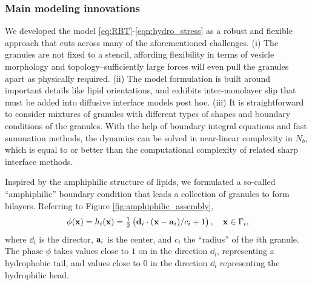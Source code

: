 \subsubsection{Main modeling innovations}
We developed the model \eqref{eq:RBT}-\eqref{eqn:hydro_stress} 
as a robust and flexible approach
that cuts across many of the aforementioned challenges.
(i) The granules are not fixed to a stencil, 
affording flexibility in terms of vesicle morphology and topology--sufficiently
large forces will even pull the granules apart as physically required.
(ii) The model formulation is built around important details like lipid orientations,
and exhibits inter-monolayer slip that must be added into diffusive interface models
post hoc. 
(iii) It is straightforward to consider mixtures of granules with different
types of shapes and boundary conditions of the granules.
With the help of boundary integral equations
and fast summation methods, the dynamics can be solved in 
near-linear complexity in $N_b$, which is equal to or better than 
the computational complexity of related sharp interface methods. 

Inspired
by the amphiphilic structure of lipids,
we formulated a so-called ``amphiphilic'' boundary condition
that leads a collection of granules to form bilayers.
Referring to Figure \ref{fig:amphiphilic_assembly}, 
\begin{equation}
\label{eq:amphiphilic_BC}
\phi(\mathbf{x}) = h_i(\mathbf{x}) = \tfrac{1}{2}\left(\dd_i \cdot (\xx - \aa_i)/c_i + 1\right), \quad
\mathbf{x} \in \Gamma_i,
\end{equation}
where $\dd_i$ is the director, $\aa_i$ is the center, and $c_i$ the
``radius'' of the $i$th granule.  
The phase $\phi$ takes values close to $1$ on in the direction $\dd_i$,
representing a hydrophobic tail, and values close to $0$ 
in the direction $\dd_i$ representing the hydrophilic head.

